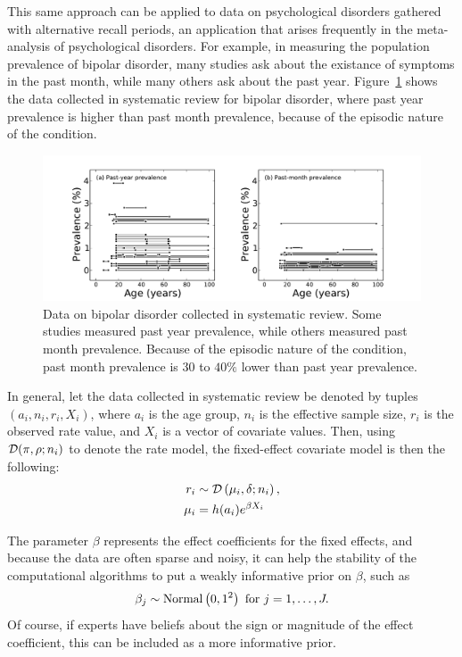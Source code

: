 This same approach can be applied to data on psychological disorders gathered with alternative recall periods, an application that arises frequently in the
meta-analysis of psychological disorders.  For example, in measuring
the population prevalence of bipolar disorder, many studies ask about
the existance of symptoms in the past month, while many others ask
about the past year.  Figure~\ref{bipolar-data-cv} shows the data
collected in systematic review for bipolar disorder, where past year
prevalence is higher than past month prevalence, because of the
episodic nature of the condition.

\begin{figure}[h]
\begin{center}
\includegraphics[width=\textwidth]{bipolar-data-by-cv.pdf}
\caption{Data on bipolar disorder collected in systematic review.
  Some studies measured past year prevalence, while others measured
  past month prevalence.  Because of the episodic nature of the
  condition, past month prevalence is $30$ to $40\%$ lower than past
  year prevalence.}
\label{bipolar-data-cv}
\end{center}
\end{figure}


In general, let the data collected in systematic review be denoted by
tuples $\left(a_i, n_i, r_i, X_i\right)$, where $a_i$ is the age
group, $n_i$ is the effective sample size, $r_i$ is the observed rate
value, and $X_i$ is a vector of covariate values. Then, using
$\mathcal{D}(\pi, \rho; n_i)$ to denote the rate model, the fixed-effect
covariate model is then the following:
\begin{align*}
r_i &\sim \mathcal{D}\left(\mu_i, \delta; n_i\right),\\
\mu_i &= h(a_i)e^{\beta X_i}
\end{align*}

The parameter $\beta$ represents the effect coefficients for
the fixed effects, and because the data are often sparse and noisy, it
can help the stability of the computational algorithms to put a weakly
informative prior on $\beta$, such as
\[
\beta_j \sim \operatorname{Normal}\left(0, 1^2\right) \text{ for } j = 1, \ldots, J.
\]
Of course, if experts have beliefs about the sign or magnitude of the
effect coefficient, this can be included as a more informative prior.

